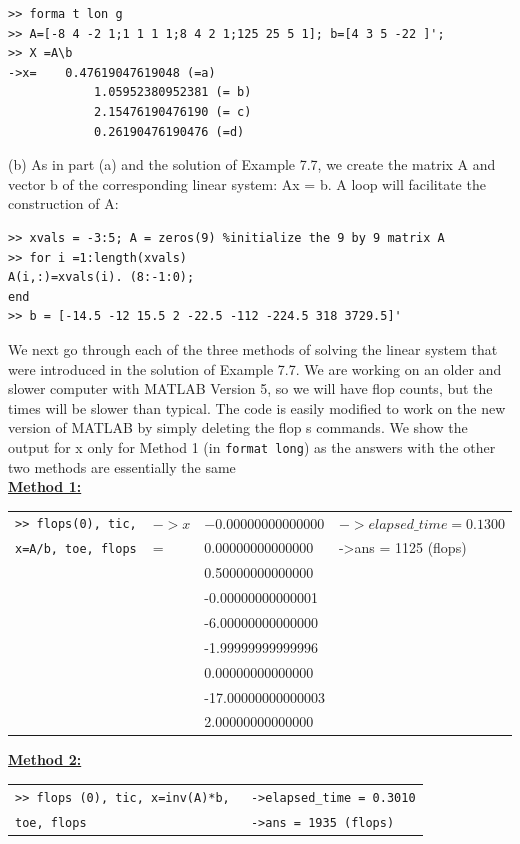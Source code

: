 \documentclass[../main.tex]{subfiles}
\begin{document}
\begin{lstlisting}[numbers=none,frame=none]
>> forma t lon g 
>> A=[-8 4 -2 1;1 1 1 1;8 4 2 1;125 25 5 1]; b=[4 3 5 -22 ]';
>> X =A\b 
->x=	0.47619047619048 (=a) 
			1.05952380952381 (= b) 
			2.15476190476190 (= c) 
			0.26190476190476 (=d) 
\end{lstlisting}
(b) As in part (a) and the solution of Example 7.7, we create the matrix A and vector b of the 
corresponding linear system: Ax = b. A loop will facilitate the construction of A: 
\begin{lstlisting}[numbers=none,frame=none]
>> xvals = -3:5; A = zeros(9) %initialize the 9 by 9 matrix A 
>> for i =1:length(xvals) 
A(i,:)=xvals(i). (8:-1:0); 
end 
>> b = [-14.5 -12 15.5 2 -22.5 -112 -224.5 318 3729.5]' 
\end{lstlisting}
We next go through each of the three methods of solving the linear system that were introduced in the 
solution of Example 7.7. We are working on an older and slower computer with MATLAB Version 5, 
so we will have flop counts, but the times will be slower than typical. The code is easily modified to 
work on the new version of MATLAB by simply deleting the flop s commands. We show the output 
for x only for Method 1 (in \texttt{format long}) as the answers with the other two methods are essentially 
the same
\\
\textbf{\underline{Method 1:}}
\begin{center}
\begin{tabular}{|l|l|l|l|}
\hline
\texttt{>> flops(0), tic,}&$->x$ &$-0.00000000000000$&$->elapsed\_time = 0.1300$\\
\texttt{x=A/b, toe, flops }&=&0.00000000000000&->ans = 1125 (flops)\\
&&0.50000000000000 &\\
&&-0.00000000000001 &\\
&& -6.00000000000000&\\
&&-1.99999999999996  &\\
&& 0.00000000000000&\\
&&-17.00000000000003  &\\
&&2.00000000000000 &\\
\hline
\end{tabular}
\end{center}
\textbf{\underline{Method 2:}}
\begin{center}
\begin{tabular}{|l|l|}
\hline
\texttt{>> flops (0), tic, x=inv(A)*b, 
}&\texttt{->elapsed\_time = 0.3010}\\
\texttt{toe, flops }&\texttt{->ans = 1935 (flops) }\\
\hline
\end{tabular}
\end{center}
\end{document}
